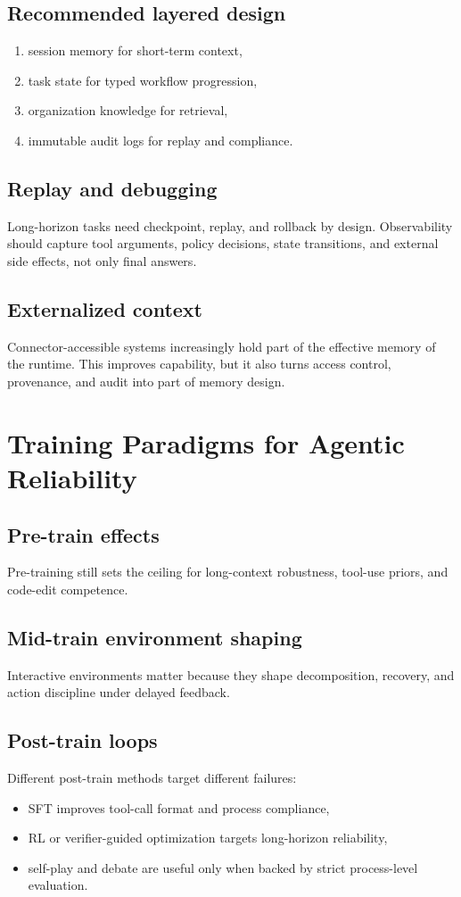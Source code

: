 \documentclass[11pt]{article}
\begin{document}
\subsection{Recommended layered design}
\begin{enumerate}[leftmargin=1.2em]
  \item session memory for short-term context,
  \item task state for typed workflow progression,
  \item organization knowledge for retrieval,
  \item immutable audit logs for replay and compliance.
\end{enumerate}

\subsection{Replay and debugging}
Long-horizon tasks need checkpoint, replay, and rollback by design. Observability should capture tool arguments, policy decisions, state transitions, and external side effects, not only final answers.

\subsection{Externalized context}
Connector-accessible systems increasingly hold part of the effective memory of the runtime. This improves capability, but it also turns access control, provenance, and audit into part of memory design.

\section{Training Paradigms for Agentic Reliability}
\subsection{Pre-train effects}
Pre-training still sets the ceiling for long-context robustness, tool-use priors, and code-edit competence.

\subsection{Mid-train environment shaping}
Interactive environments matter because they shape decomposition, recovery, and action discipline under delayed feedback.

\subsection{Post-train loops}
Different post-train methods target different failures:
\begin{itemize}[leftmargin=1.2em]
  \item SFT improves tool-call format and process compliance,
  \item RL or verifier-guided optimization targets long-horizon reliability,
  \item self-play and debate are useful only when backed by strict process-level evaluation.
\end{itemize}
\end{document}
